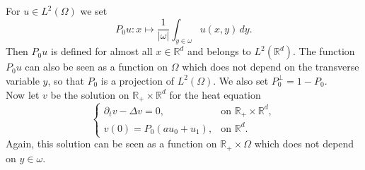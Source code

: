 \documentclass[10pt, a4paper,reqno]{amsart}
\theoremstyle{plain}
\theoremstyle{definition}
\theoremstyle{remark}
\begin{document}
For $u \in L^2({\Omega})$ we set 
\begin{equation} \label{def-P0}
P_0 u : x \mapsto \frac 1 {{\left\vert {\omega}\right\vert}} \int_{y \in {\omega}} u(x,y)\, dy.
\end{equation}
Then $P_0 u$ is defined for almost all $x \in {\mathbb{R}}^d$ and belongs to $L^2({\mathbb{R}}^d)$. The function $P_0 u$ can also be seen as a function on ${\Omega}$ which does not depend on the transverse variable $y$, so that $P_0$ is a projection of $L^2({\Omega})$. We also set $P_0^\bot = 1- P_0$.\\

Now let $v$ be the solution on ${\mathbb{R}}_+ \times {\mathbb{R}}^d$ for the heat equation
\begin{equation} \label{heat}
\begin{cases}
\partial_t v - {\Delta} v = 0, & \text{on } {\mathbb{R}}_+ \times {\mathbb{R}}^d,\\
v(0) = P_0 (a u_0 + u_1) ,& \text{on } {\mathbb{R}}^d.
\end{cases}
\end{equation}
Again, this solution can be seen as a function on ${\mathbb{R}}_+ \times {\Omega}$ which does not depend on $y \in {\omega}$.
\end{document}
